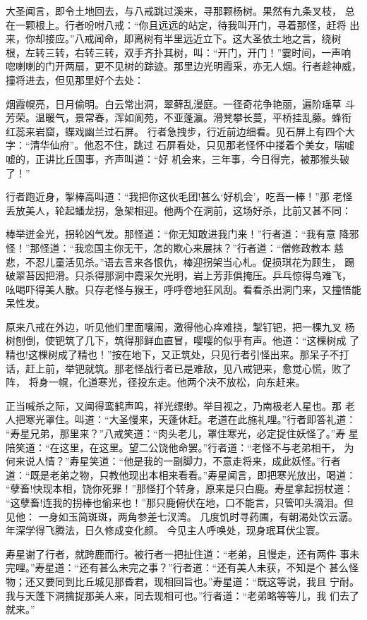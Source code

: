 大圣闻言，即令土地回去，与八戒跳过溪来，寻那颗杨树。果然有九条叉枝，
总在一颗根上。行者吩咐八戒：“你且远远的站定，待我叫开门，寻着那怪，赶将
出来，你却接应。”八戒闻命，即离树有半里远近立下。这大圣依土地之言，绕树
根，左转三转，右转三转，双手齐扑其树，叫：“开门，开门！”霎时间，一声响，
唿喇喇的门开两扇，更不见树的踪迹。那里边光明霞采，亦无人烟。行者趁神威，
撞将进去，但见那里好个去处：

烟霞幌亮，日月偷明。白云常出洞，翠藓乱漫庭。一径奇花争艳丽，遍阶瑶草
斗芳荣。温暖气，景常春，浑如阆苑，不亚蓬瀛。滑凳攀长蔓，平桥挂乱藤。蜂衔
红蕊来岩窟，蝶戏幽兰过石屏。
行者急拽步，行近前边细看。见石屏上有四个大字：“清华仙府”。他忍不住，跳过
石屏看处，只见那老怪怀中搂着个美女，喘嘘嘘的，正讲比丘国事，齐声叫道：“好
机会来，三年事，今日得完，被那猴头破了！”

行者跑近身，掣棒高叫道：“我把你这伙毛团!甚么‘好机会’，吃吾一棒！”那
老怪丢放美人，轮起蟠龙拐，急架相迎。他两个在洞前，这场好杀，比前又甚不同：

棒举迸金光，拐轮凶气发。那怪道：“你无知敢进我门来！”行者道：“我有意
降邪怪！”那怪道：“我恋国主你无干，怎的欺心来展抹？”行者道：“僧修政教本
慈悲，不忍儿童活见杀。”语去言来各恨仇，棒迎拐架当心札。促损琪花为顾生，
踢破翠苔因把滑。只杀得那洞中霞采欠光明，岩上芳菲俱掩压。乒乓惊得鸟难飞，
吆喝吓得美人散。只存老怪与猴王，呼呼卷地狂风刮。看看杀出洞门来，又撞悟能
呆性发。

原来八戒在外边，听见他们里面嚷闹，激得他心痒难挠，掣钉钯，把一棵九叉
杨树刨倒，使钯筑了几下，筑得那鲜血直冒，嘤嘤的似乎有声。他道：“这棵树成
了精也!这棵树成了精也！”按在地下，又正筑处，只见行者引怪出来。那呆子不打
话，赶上前，举钯就筑。那老怪战行者已是难敌，见八戒钯来，愈觉心慌，败了阵，
将身一幌，化道寒光，径投东走。他两个决不放松，向东赶来。

正当喊杀之际，又闻得鸾鹤声鸣，祥光缥缈。举目视之，乃南极老人星也。那
老人把寒光罩住。叫道：“大圣慢来，天蓬休赶。老道在此施礼哩。”行者即答礼道：
“寿星兄弟，那里来？”八戒笑道：“肉头老儿，罩住寒光，必定捉住妖怪了。”寿
星陪笑道：“在这里，在这里。望二公饶他命罢。”行者道：“老怪不与老弟相干，
为何来说人情？”寿星笑道：“他是我的一副脚力，不意走将来，成此妖怪。”行者
道：“既是老弟之物，只教他现出本相来看看。”寿星闻言，即把寒光放出，喝道：
“孽畜!快现本相，饶你死罪！”那怪打个转身，原来是只白鹿。寿星拿起拐杖道：
“这孽畜!连我的拐棒也偷来也！”那只鹿俯伏在地，口不能言，只管叩头滴泪。但
见他：
一身如玉简斑斑，两角参差七汊湾。
几度饥时寻药圃，有朝渴处饮云潺。
年深学得飞腾法，日久修成变化颜。
今见主人呼唤处，现身珉耳伏尘寰。

寿星谢了行者，就跨鹿而行。被行者一把扯住道：“老弟，且慢走，还有两件
事未完哩。”寿星道：“还有甚么未完之事？”行者道：“还有美人未获，不知是个
甚么怪物；还又要同到比丘城见那昏君，现相回旨也。”寿星道：“既这等说，我且
宁耐。我与天蓬下洞擒捉那美人来，同去现相可也。”行者道：“老弟略等等儿，我
们去了就来。”


